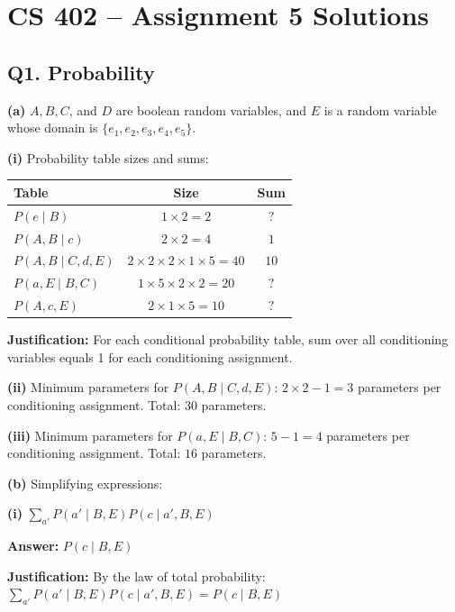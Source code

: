 \documentclass[11pt]{article}
\begin{document}
\section*{CS 402 -- Assignment 5 Solutions}

\subsection*{Q1. Probability}

\textbf{(a)} $A, B, C$, and $D$ are boolean random variables, and $E$ is a random variable whose domain is $\{e_1, e_2, e_3, e_4, e_5\}$.

\textbf{(i)} Probability table sizes and sums:

\begin{center}
\begin{tabular}{|l|c|c|}
\hline
Table & Size & Sum \\
\hline
$P(e \mid B)$ & $1 \times 2 = 2$ & $\boxed{?}$ \\
$P(A, B \mid c)$ & $2 \times 2 = 4$ & $\boxed{1}$ \\
$P(A, B \mid C, d, E)$ & $2 \times 2 \times 2 \times 1 \times 5 = 40$ & $\boxed{10}$ \\
$P(a, E \mid B, C)$ & $1 \times 5 \times 2 \times 2 = 20$ & $\boxed{?}$ \\
$P(A, c, E)$ & $2 \times 1 \times 5 = 10$ & $\boxed{?}$ \\
\hline
\end{tabular}
\end{center}

\textbf{Justification:} For each conditional probability table, sum over all conditioning variables equals 1 for each conditioning assignment.

\textbf{(ii)} Minimum parameters for $P(A, B \mid C, d, E)$: $2 \times 2 - 1 = 3$ parameters per conditioning assignment. Total: $\boxed{30}$ parameters.

\textbf{(iii)} Minimum parameters for $P(a, E \mid B, C)$: $5 - 1 = 4$ parameters per conditioning assignment. Total: $\boxed{16}$ parameters.

\textbf{(b)} Simplifying expressions:

\textbf{(i)} $\sum_{a'} P(a' \mid B, E) P(c \mid a', B, E)$

\textbf{Answer:} $\boxed{P(c \mid B, E)}$

\textbf{Justification:} By the law of total probability: $\sum_{a'} P(a' \mid B, E) P(c \mid a', B, E) = P(c \mid B, E)$
\end{document}
